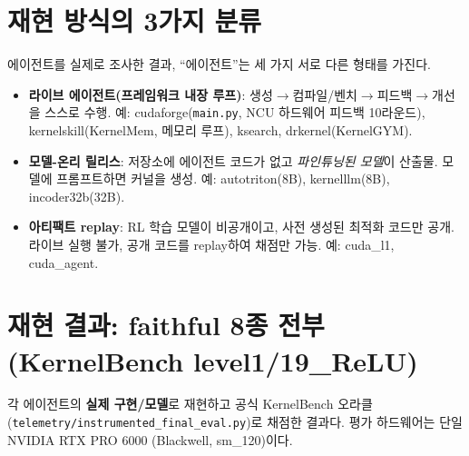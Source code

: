 \documentclass[11pt]{article}
\newcommand{\code}[1]{\texttt{\small #1}}
\begin{document}
\section{재현 방식의 3가지 분류}
에이전트를 실제로 조사한 결과, ``에이전트''는 세 가지 서로 다른 형태를 가진다.
\begin{itemize}
  \item \textbf{라이브 에이전트(프레임워크 내장 루프)}: 생성$\to$컴파일/벤치$\to$피드백$\to$개선을
        스스로 수행. 예: cudaforge(\code{main.py}, NCU 하드웨어 피드백 10라운드),
        kernelskill(KernelMem, 메모리 루프), ksearch, drkernel(KernelGYM).
  \item \textbf{모델-온리 릴리스}: 저장소에 에이전트 코드가 없고 \emph{파인튜닝된 모델}이 산출물.
        모델에 프롬프트하면 커널을 생성. 예: autotriton(8B), kernelllm(8B), incoder32b(32B).
  \item \textbf{아티팩트 replay}: RL 학습 모델이 비공개이고, 사전 생성된 최적화 코드만 공개.
        라이브 실행 불가, 공개 코드를 replay하여 채점만 가능. 예: cuda\_l1, cuda\_agent.
\end{itemize}

\section{재현 결과: faithful 8종 전부 (KernelBench level1/19\_ReLU)}
각 에이전트의 \textbf{실제 구현/모델}로 재현하고 공식 KernelBench 오라클
(\code{telemetry/instrumented\_final\_eval.py})로 채점한 결과다.
평가 하드웨어는 단일 NVIDIA RTX PRO 6000 (Blackwell, sm\_120)이다.
\end{document}
